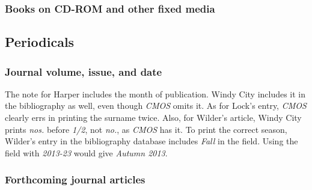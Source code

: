\documentclass[11pt,letterpaper,oneside]{article}
\begin{document}
\subsubsection{Books on CD-ROM and other fixed media}
\label{14.163}

\begin{citebib}
\item \cite*[1.4]{chicago2003}
\end{citebib}

\setcounter{subsection}{5}
\subsection{Periodicals}
\setcounter{subsection}{14}

\setcounter{subsubsection}{170}
\subsubsection{Journal volume, issue, and date}
\label{14.171}

The note for Harper includes the month of publication. Windy City
includes it in the bibliography as well, even though \textit{CMOS}
omits it. As for Lock's entry, \textit{CMOS} clearly errs in printing
the surname twice. Also, for Wilder's article, Windy City prints
\textit{nos.} before \textit{1/2}, not \textit{no.}, as \textit{CMOS}
has it. To print the correct season, Wilder's entry in the
bibliography database includes \textit{Fall} in the 
field. Using the  field with \textit{2013-23} would
give \textit{Autumn 2013}.

\begin{citebib}
\item \cite[155]{lock2015}
\item \cite[651]{wesoky2015}
\item \cite[645]{harper2014}
\item \cite[60]{wilder2013}
\item \cite[52]{beattie1974}
\end{citebib}

\subsubsection{Forthcoming journal articles}

\begin{citebib}
\item \cite{authora}
\end{citebib}
\end{document}
